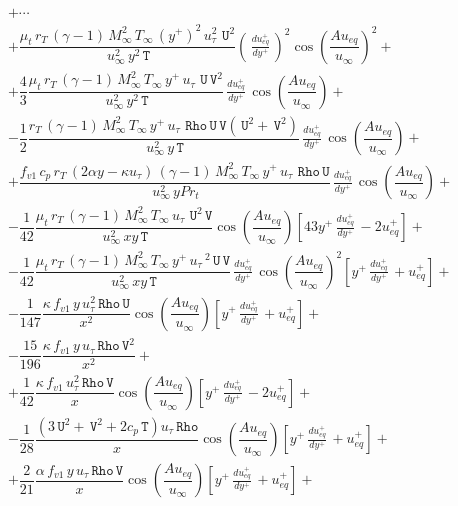 \documentclass[10pt]{article}
\newcommand{\Rho}{\,\mathtt{Rho}}
\newcommand{\U}{\,\mathtt{U}}
\newcommand{\V}{\,\mathtt{V}}
\newcommand{\T}{\,\mathtt{T}}
\newcommand{\Dueqplusyplus}{\, \frac{du_{eq}^+}{dy^+}\,}
\begin{document}
\begin{equation}\label{eq:ns_2d_e}
\begin{split}
&+\cdots\\
&+\dfrac{\mu_t\, r_T \,(\gamma-1) \, M_{\infty}^2\, T_{\infty}\, ( y^{+})^2 \, u_{\tau}^2 \,  \U^2 }{\, u_{\infty}^2 \, y^2 \T}\left(\Dueqplusyplus\right)^2\cos\left(\dfrac{A u_{eq}}{u_{\infty}}\right)^2+ \\ 
&+\dfrac{4}{3} \dfrac{\mu_t\, r_T\, (\gamma-1) \,M_{\infty}^2 \,T_{\infty}\, y^{+}\, u_{\tau}\, \U \V^2}{\, u_{\infty}^2 \, y^2 \T} \Dueqplusyplus \cos\left(\dfrac{A u_{eq}}{u_{\infty}}\right)+ \\ 
&-\dfrac{1}{2} \dfrac{r_T\, (\gamma-1) \,M_{\infty}^2\, T_{\infty} \,y^{+} \,u_{\tau}\,\Rho \U \V(\U^2+\V^2) }{\, u_{\infty}^2 \, y \T}  \Dueqplusyplus \cos\left(\dfrac{A u_{eq}}{u_{\infty}}\right)+ \\ 
&+\dfrac{  f_{v1} \,c_p \,r_T\,(2 \alpha y-\kappa u_{\tau})\, (\gamma-1) \,M_{\infty}^2 \,T_{\infty}\, y^{+} \,u_{\tau}\,\Rho \U }{\, u_{\infty}^2 \, y Pr_t} \Dueqplusyplus \cos\left(\dfrac{A u_{eq}}{u_{\infty}}\right)+ \\ 
&-\dfrac{1}{42} \dfrac{ \mu_t \, r_T\, (\gamma-1)\,M_{\infty}^2 \,T_{\infty}\, u_{\tau}\, \U^2 \V }{\, u_{\infty}^2 \, x y \T}\cos\left(\dfrac{A u_{eq}}{u_{\infty}}\right)\left[43 y^{+} \Dueqplusyplus-2 u_{eq}^{+}\right]+ \\ 
&-\dfrac{1}{42}\dfrac{ \mu_t\, r_T\, (\gamma-1) \,M_{\infty}^2 \,T_{\infty}\, y^{+}\, u_{\tau}\,^2 \U \V }{\, u_{\infty}^2 \, x y \T}\Dueqplusyplus \cos\left(\dfrac{A u_{eq}}{u_{\infty}}\right)^2\left[y^{+} \Dueqplusyplus+u_{eq}^{+}\right] + \\ 
&-\dfrac{1}{147}\dfrac{ \kappa\,  f_{v1}\, y \,u_{\tau}^2 \Rho \U}{x^2} \cos\left(\dfrac{A u_{eq}}{u_{\infty}}\right) \left[y^{+} \Dueqplusyplus+u_{eq}^{+}\right]+\\ 
&-\dfrac{15}{196}\dfrac{\kappa\,  f_{v1}\, y \,u_{\tau} \Rho \V^2}{x^2}+\\ 
&+\dfrac{1}{42} \dfrac{\kappa\,  f_{v1}\,  u_{\tau}^2 \Rho \V}{x} \cos\left(\dfrac{A u_{eq}}{u_{\infty}}\right) \left[y^{+} \Dueqplusyplus-2 u_{eq}^{+}\right]+\\ 
&-\dfrac{1}{28}\dfrac{(3 \U^2+\V^2+2 c_p \T) u_{\tau} \Rho}{x} \cos\left(\dfrac{A u_{eq}}{u_{\infty}}\right) \left[y^{+} \Dueqplusyplus+u_{eq}^{+}\right]+\\ 
&+\dfrac{2}{21} \dfrac{\alpha \,  f_{v1} \,y \, u_{\tau} \Rho \V }{x}\cos\left(\dfrac{A u_{eq}}{u_{\infty}}\right) \left[y^{+} \Dueqplusyplus+u_{eq}^{+}\right] +\\ 

\end{split}
\end{equation}
\end{document}
